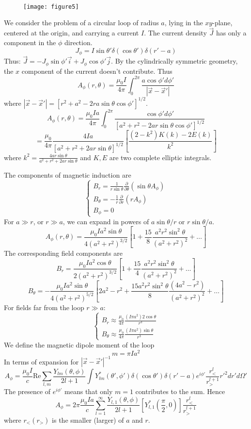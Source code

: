 \documentclass{article}
\begin{document}
	\begin{figure}[h]
		\centering
		\texttt{[image: figure5]}
		\caption{}
		\label{fig:figure5}
	\end{figure}
	
	We consider the problem of a circular loop of radius $a$, lying in the $xy$-plane, centered at the origin, and carrying a current $I$.
	The current density $\vec{J}$ has only a component in the $\phi$ direction.
	\[
	J_\phi = I \sin\theta' \delta(\cos\theta') \delta(r'-a)
	\]
	Thus: $\vec{J} = -J_\phi \sin\phi' \vec{i} + J_\phi \cos\phi' \vec{j}$.
	By the cylindrically symmetric geometry, the $x$ component of the current doesn't contribute. Thus
	\[
	A_\phi(r, \theta) = \frac{\mu_0 I}{4\pi} \int_0^{2\pi} \frac{a \cos\phi' d\phi'}{|\vec{x}-\vec{x}'|}
	\]
	where $|\vec{x}-\vec{x}'| = [r^2+a^2-2ra\sin\theta\cos\phi']^{1/2}$.
	\[
	A_\phi(r, \theta) = \frac{\mu_0 I a}{4\pi} \int_0^{2\pi} \frac{\cos\phi' d\phi'}{[a^2+r^2-2ar\sin\theta\cos\phi']^{1/2}}
	\]
	\[
	= \frac{\mu_0}{4\pi} \frac{4Ia}{[a^2+r^2+2ar\sin\theta]^{1/2}} \left[ \frac{(2-k^2)K(k)-2E(k)}{k^2} \right]
	\]
	where $k^2 = \frac{4ar\sin\theta}{a^2+r^2+2ar\sin\theta}$ and $K, E$ are two complete elliptic integrals.
	
	The components of magnetic induction are
	\[
	\begin{cases}
		B_r = \frac{1}{r\sin\theta} \frac{\partial}{\partial\theta} (\sin\theta A_\phi) \\
		B_\theta = -\frac{1}{r} \frac{\partial}{\partial r} (r A_\phi) \\
		B_\phi = 0
	\end{cases}
	\]
	For $a \gg r$, or $r \gg a$, we can expand in powers of $a \sin\theta/r$ or $r \sin\theta/a$.
	\[
	A_\phi(r, \theta) = \frac{\mu_0 I a^2 \sin\theta}{4(a^2+r^2)^{3/2}} \left[ 1 + \frac{15}{8} \frac{a^2 r^2 \sin^2\theta}{(a^2+r^2)^2} + \dots \right]
	\]
	The corresponding field components are
	\[
	B_r = \frac{\mu_0 I a^2 \cos\theta}{2(a^2+r^2)^{3/2}} \left[ 1 + \frac{15}{4} \frac{a^2 r^2 \sin^2\theta}{(a^2+r^2)^2} + \dots \right]
	\]
	\[
	B_\theta = -\frac{\mu_0 I a^2 \sin\theta}{4(a^2+r^2)^{5/2}} \left[ 2a^2 - r^2 + \frac{15a^2 r^2 \sin^2\theta}{8} \frac{(4a^2-r^2)}{(a^2+r^2)^2} + \dots \right]
	\]
	For fields far from the loop $r \gg a$:
	\[
	\begin{cases}
		B_r \approx \frac{\mu_0}{4\pi} \frac{(I \pi a^2) 2\cos\theta}{r^3} \\
		B_\theta \approx \frac{\mu_0}{4\pi} \frac{(I \pi a^2) \sin\theta}{r^3}
	\end{cases}
	\]
	We define the magnetic dipole moment of the loop
	\[
	m = \pi I a^2
	\]
	In terms of expansion for $|\vec{x} - \vec{x}'|^{-1}$
	\[
	A_\phi = \frac{\mu_0 I}{c} \text{Re} \sum_{l,m} \frac{Y_{lm}(\theta, \phi)}{2l+1} \int Y_{lm}^*(\theta', \phi') \delta(\cos\theta')\delta(r'-a) e^{i\phi'} \frac{r_<^l}{r_>^{l+1}} r'^2 dr' d\Omega'
	\]
	The presence of $e^{i\phi'}$ means that only $m=1$ contributes to the sum. Hence
	\[
	A_\phi = 2\pi \frac{\mu_0 I a}{c} \sum_{l=1}^{\infty} \frac{Y_{l,1}(\theta, \phi)}{2l+1} \left[ Y_{l,1}^*(\frac{\pi}{2}, 0) \right] \frac{r_<^l}{r_>^{l+1}}
	\]
	where $r_< (r_>)$ is the smaller (larger) of $a$ and $r$.
	
\end{document}
